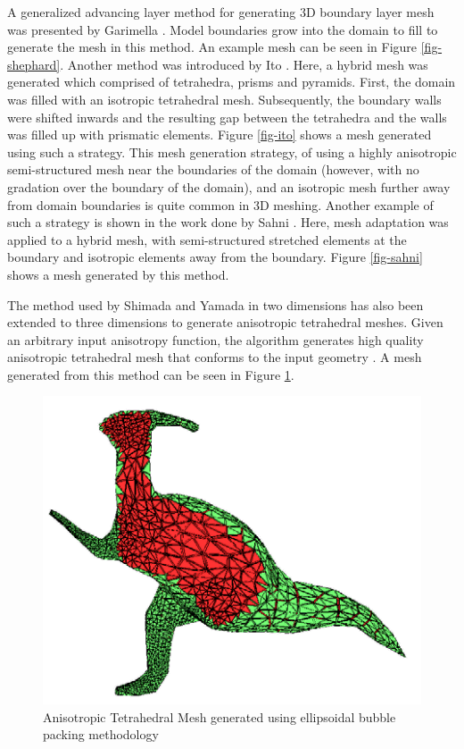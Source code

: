 A generalized advancing layer method for generating 3D boundary layer mesh was presented by Garimella \etal \cite{garimella2000boundary}. Model boundaries grow into the domain to fill to generate the mesh in this method. An example mesh can be seen in Figure \ref{fig-shephard}. Another method was introduced by Ito \etal \cite{ito2002unstructured}. Here, a hybrid mesh was generated which comprised of tetrahedra, prisms and pyramids. First, the domain was filled with an isotropic tetrahedral mesh. Subsequently, the boundary walls were shifted inwards and the resulting gap between the tetrahedra and the walls was filled up with prismatic elements. Figure \ref{fig-ito} shows a mesh generated using such a strategy. This mesh generation strategy, of using a highly anisotropic semi-structured mesh near the boundaries of the domain (however, with no gradation over the boundary of the domain), and an isotropic mesh further away from domain boundaries is quite common in 3D meshing. Another example of such a strategy is shown in the work done by Sahni \etal \cite{sahni2008adaptive}. Here, mesh adaptation was applied to a hybrid mesh, with semi-structured stretched elements at the boundary and isotropic elements away from the boundary. Figure \ref{fig-sahni} shows a mesh generated by this method.

The method used by Shimada and Yamada in two dimensions has also been extended to three dimensions to generate anisotropic tetrahedral meshes. Given an arbitrary input anisotropy function, the algorithm generates high quality anisotropic tetrahedral mesh that conforms to the input geometry \cite{yamakawa2000high}. A mesh generated from this method can be seen in Figure \ref{fig-yamakawa}.

\begin{figure}
	\centering
	\includegraphics[width=0.5\linewidth]{img/intro/lit/highQualityTetMesh.png}
	\caption{Anisotropic Tetrahedral Mesh generated using ellipsoidal bubble packing methodology  \cite{yamakawa2000high}}
	\label{fig-yamakawa}
\end{figure}


